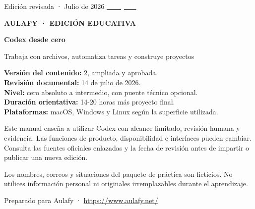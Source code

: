 \documentclass[10pt,a4paper,openany]{book}
\begin{document}
\vspace{8mm}
{\sffamily\color{white}\small Edición revisada · Julio de 2026\hfill
\href{https://www.aulafy.net/}{\textcolor{white}{aulafy.net}}}
\par
\endgroup

\clearpage
{}
\hypersetup{pageanchor=true}

\thispagestyle{plain}
\vspace*{18mm}
{\sffamily\bfseries\color{BrandViolet}\fontsize{11}{14}\selectfont AULAFY · EDICIÓN EDUCATIVA\par}
\vspace{4mm}
{\sffamily\bfseries\fontsize{24}{29}\selectfont Codex desde cero\par}
\vspace{3mm}
{\sffamily\color{TextMuted}\large Trabaja con archivos, automatiza tareas y construye proyectos\par}

\vspace{12mm}
\begin{tcolorbox}[
  enhanced,colback=Panel,colframe=Border,boxrule=0.5pt,arc=2mm,
  left=4mm,right=4mm,top=4mm,bottom=4mm
]
\sffamily\small
\textbf{Versión del contenido:} 2, ampliada y aprobada.\\
\textbf{Revisión documental:} 14 de julio de 2026.\\
\textbf{Nivel:} cero absoluto a intermedio, con puente técnico opcional.\\
\textbf{Duración orientativa:} 14-20 horas más proyecto final.\\
\textbf{Plataformas:} macOS, Windows y Linux según la superficie utilizada.
\end{tcolorbox}

\vfill
{\small\color{TextMuted}
Este manual enseña a utilizar Codex con alcance limitado, revisión humana y evidencia. Las funciones de producto, disponibilidad e interfaces pueden cambiar. Consulta las fuentes oficiales enlazadas y la fecha de revisión antes de impartir o publicar una nueva edición.\par

Los nombres, correos y situaciones del paquete de práctica son ficticios. No utilices información personal ni originales irremplazables durante el aprendizaje.\par}
\vspace{8mm}
{\sffamily\footnotesize\color{TextMuted}Preparado para Aulafy ·
\href{https://www.aulafy.net/}{https://www.aulafy.net/}}
\clearpage
\end{document}
